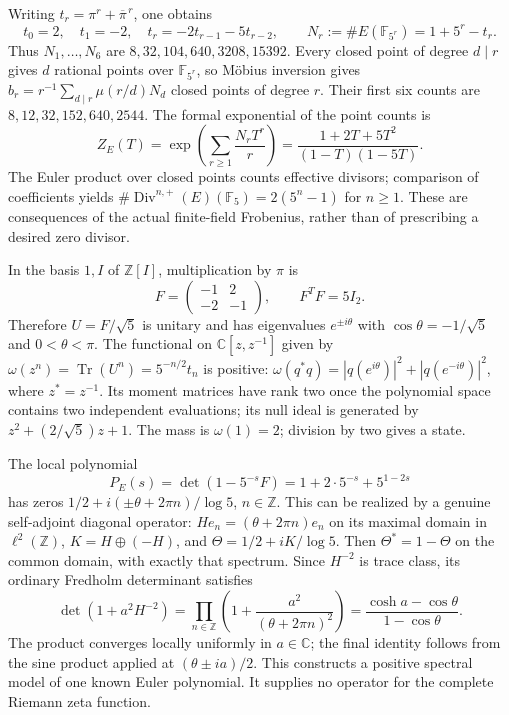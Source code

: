 Writing $t_r=\pi^r+\overline\pi^{\,r}$, one obtains
\[
 t_0=2,\quad t_1=-2,\quad t_r=-2t_{r-1}-5t_{r-2},\qquad
 N_r:=\#E(\mathbb F_{5^r})=1+5^r-t_r.
\]
Thus $N_1,\ldots,N_6$ are
$8,32,104,640,3208,15392$.
Every closed point of degree $d\mid r$ gives $d$ rational points over
$\mathbb F_{5^r}$, so M\"obius inversion gives
$b_r=r^{-1}\sum_{d\mid r}\mu(r/d)N_d$ closed points of degree $r$.
Their first six counts are $8,12,32,152,640,2544$.
The formal exponential of the point counts is
\[
 Z_E(T)=\exp\left(\sum_{r\geq1}\frac{N_rT^r}{r}\right)
       =\frac{1+2T+5T^2}{(1-T)(1-5T)}.
\]
The Euler product over closed points counts effective divisors; comparison
of coefficients yields $\#\operatorname{Div}^{n,+}(E)(\mathbb F_5)
=2(5^n-1)$ for $n\geq1$.
These are consequences of the actual finite-field Frobenius, rather than
of prescribing a desired zero divisor.

In the basis $1,I$ of $\mathbb Z[I]$, multiplication by $\pi$ is
\[
 F=\begin{pmatrix}-1&2\\-2&-1\end{pmatrix},\qquad F^TF=5I_2.
\]
Therefore $U=F/\sqrt5$ is unitary and has eigenvalues $e^{\pm i\theta}$
with $\cos\theta=-1/\sqrt5$ and $0<\theta<\pi$.
The functional on $\mathbb C[z,z^{-1}]$ given by
$\omega(z^n)=\operatorname{Tr}(U^n)=5^{-n/2}t_n$ is positive:
$\omega(q^*q)=|q(e^{i\theta})|^2+|q(e^{-i\theta})|^2$,
where $z^*=z^{-1}$.  Its moment matrices have rank two once the polynomial
space contains two independent evaluations; its null ideal is generated
by $z^2+(2/\sqrt5)z+1$.
The mass is $\omega(1)=2$; division by two gives a state.

The local polynomial
\[
 P_E(s)=\det(1-5^{-s}F)=1+2\cdot5^{-s}+5^{1-2s}
\]
has zeros $1/2+i(\pm\theta+2\pi n)/\log5$, $n\in\mathbb Z$.
This can be realized by a genuine self-adjoint diagonal operator:
$He_n=(\theta+2\pi n)e_n$ on its maximal domain in $\ell^2(\mathbb Z)$,
$K=H\oplus(-H)$, and $\Theta=1/2+iK/\log5$.
Then $\Theta^*=1-\Theta$ on the common domain, with exactly that spectrum.
Since $H^{-2}$ is trace class, its ordinary Fredholm determinant satisfies
\[
 \det(1+a^2H^{-2})
 =\prod_{n\in\mathbb Z}\left(1+\frac{a^2}{(\theta+2\pi n)^2}\right)
 =\frac{\cosh a-\cos\theta}{1-\cos\theta}.
\]
The product converges locally uniformly in $a\in\mathbb C$; the final
identity follows from the sine product applied at $(\theta\pm ia)/2$.
This constructs a positive spectral model of one known Euler polynomial.
It supplies no operator for the complete Riemann zeta function.

